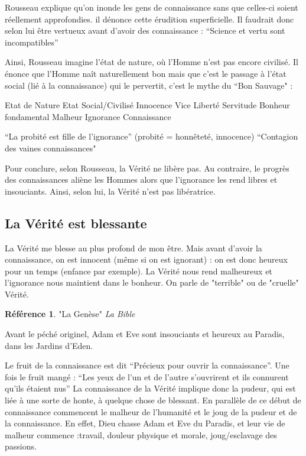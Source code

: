 \documentclass[french]{book}
\theoremstyle{definition}
\newtheorem*{refe}{Référence}
\begin{document}
Rousseau explique qu’on inonde les gens de connaissance sans que celles-ci soient réellement approfondies. il dénonce cette érudition superficielle. Il faudrait donc selon lui être vertueux avant d'avoir des connaissance :
“Science et vertu sont incompatibles”

Ainsi, Rousseau imagine l’état de nature, où l’Homme n’est pas encore civilisé. Il énonce que l’Homme naît naturellement bon mais que c’est le passage à l’état social (lié à la connaissance) qui le pervertit, c’est le mythe du “Bon Sauvage" :

Etat de Nature
Etat Social/Civilisé
Innocence
Vice
Liberté
Servitude
Bonheur fondamental
Malheur
Ignorance
Connaissance


“La probité est fille de l’ignorance” (probité = honnêteté, innocence)
“Contagion des vaines connaissances"

Pour conclure, selon Rousseau, la Vérité ne libère pas. Au contraire, le progrès des connaissances aliène les Hommes alors que l’ignorance les rend libres et insouciants. Ainsi, selon lui, la Vérité n’est pas libératrice.

\subsection{La Vérité est blessante}
La Vérité me blesse au plus profond de mon être. Mais avant d’avoir la connaissance, on est innocent (même si on est ignorant) : on est donc heureux pour un temps (enfance par exemple).
La Vérité nous rend malheureux et l’ignorance nous maintient dans le bonheur.
On parle de "terrible" ou de "cruelle" Vérité.

\begin{refe}
	"La Genèse" \textit{La Bible} 
\end{refe}

Avant le péché originel, Adam et Eve sont insouciants  et heureux au Paradis, dans les Jardins d’Eden.

Le fruit de la connaissance est dit “Précieux pour ouvrir la connaissance”. Une fois le fruit mangé : “Les yeux de l’un et de l’autre s’ouvrirent et ils connurent qu’ils étaient nus”
La connaissance de la Vérité implique donc la pudeur, qui est liée à une sorte de honte, à quelque chose de blessant.
En parallèle de ce début de connaissance commencent le malheur de l’humanité et le joug de la pudeur et de la connaissance.
En effet, Dieu chasse Adam et Eve du Paradis, et leur vie de malheur commence :travail, douleur physique et morale, joug/esclavage des passions.
\end{document}
